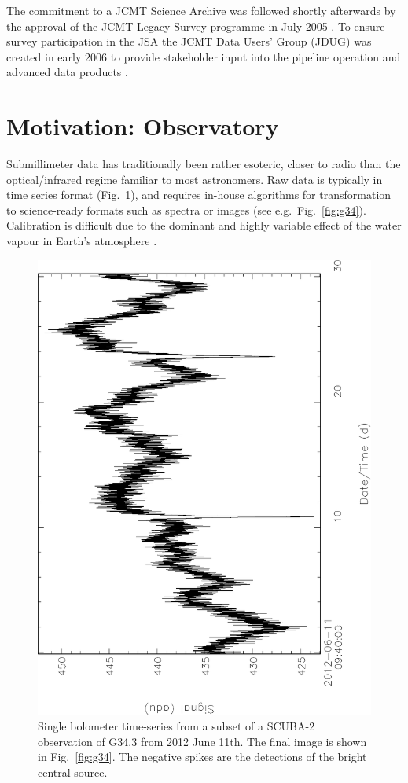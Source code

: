 \documentclass[final,authoryear,5p,times,twocolumn]{elsarticle}
\begin{document}
The commitment to a JCMT Science Archive was followed shortly
afterwards by the approval of the JCMT Legacy Survey programme in July
2005 \citep{2005JCMTN23}. To ensure survey participation in the JSA
the JCMT Data Users' Group (JDUG) was created in early 2006 to provide
stakeholder input into the pipeline operation and advanced data
products \citep{2006JCMTN24R}.

\section{Motivation: Observatory}

Submillimeter data has traditionally been rather esoteric, closer to
radio than the optical/infrared regime familiar to most
astronomers. Raw data is typically in time series format (Fig.~\ref{fig:g34ts}), and requires
in-house algorithms for transformation to science-ready formats such
as spectra or images (see e.g.\ Fig.~\ref{fig:g34}). Calibration is
difficult due to the dominant and highly variable effect of the water
vapour in Earth's atmosphere
\citep[e.g.,][]{2002MNRAS.336....1A,2013MNRAS.430.2534D}.

\begin{figure}[t]
\includegraphics[angle=-90,width=\columnwidth]{g34ts}
\caption{Single bolometer time-series from a subset of a SCUBA-2
  observation of G34.3 from 2012 June 11th. The final image is shown in
  Fig.~\ref{fig:g34}. The negative spikes are the detections of the
  bright central source.}
\label{fig:g34ts}
\end{figure}
\end{document}
